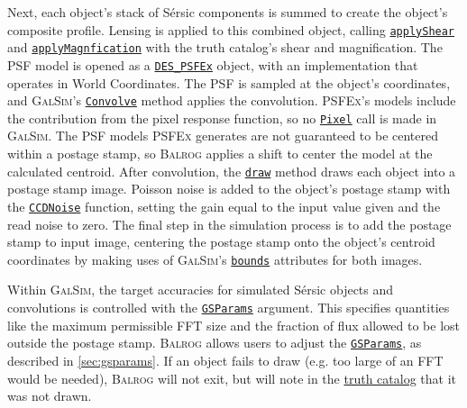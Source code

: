 \documentclass[11pt]{book}
\newcommand{\galsim}{\textsc{GalSim}}
\newcommand{\balrog}{\textsc{Balrog}}
\newcommand{\psfex}{\textsc{PSFEx}}
\newcommand{\sersic}{S\'{e}rsic}
\begin{document}
Next, each object's stack of \sersic{} components is summed to create the object's composite profile. 
Lensing is applied to this combined object, 
calling \href{http://galsim-developers.github.io/GalSim/classgalsim\_1\_1base\_1\_1\_g\_s\_object.html#a85cc0094dcf470cfbff93d9830ab80bd}{\texttt{applyShear}}
and \href{http://galsim-developers.github.io/GalSim/classgalsim\_1\_1base\_1\_1\_g\_s\_object.html#a9d13b0238057f6d5d01f2681d91c09b0}{\texttt{applyMagnfication}}
with the truth catalog's shear and magnification.
The PSF model is opened as a 
\href{http://galsim-developers.github.io/GalSim/classgalsim\_1\_1des\_1\_1des\_\_psfex\_1\_1\_d\_e\_s\_\_\_p\_s\_f\_ex.html}{\texttt{DES\_PSFEx}} object, 
with an implementation that operates in World Coordinates. 
The PSF is sampled at the object's coordinates, 
and \galsim{}'s \href{http://galsim-developers.github.io/GalSim/classgalsim\_1\_1compound\_1\_1\_convolution.html}{\texttt{Convolve}} method applies the convolution.
\psfex{}'s models include the contribution from the pixel response function, 
so no \href{http://galsim-developers.github.io/GalSim/classgalsim\_1\_1base\_1\_1\_pixel.html}{\texttt{Pixel}} call is made in \galsim{}.
The PSF models \psfex{} generates are not guaranteed to be centered within a postage stamp, 
so \balrog{} applies a shift to center the model at the calculated centroid.
After convolution, 
the \href{http://galsim-developers.github.io/GalSim/classgalsim\_1\_1base\_1\_1\_g\_s\_object.html#ae0b346a8b438dedbc7f60a52220869d8}{\texttt{draw}} 
method draws each object into a postage stamp image.
Poisson noise is added to the object's postage stamp with the 
\href{http://galsim-developers.github.io/GalSim/classgalsim\_1\_1\_c\_c\_d\_noise.html}{\texttt{CCDNoise}} function, 
setting the gain equal to the input value given and the read noise to zero.
The final step in the simulation process is to add the postage stamp to input image, 
centering the postage stamp onto the object's centroid coordinates 
by making uses of \galsim{}'s \href{http://galsim-developers.github.io/GalSim/classgalsim\_1\_1\_bounds.html}{\texttt{bounds}} attributes for both images.

Within \galsim{}, the target accuracies for simulated \sersic{} objects and convolutions is controlled with the 
\href{http://galsim-developers.github.io/GalSim/structgalsim\_1\_1\_g\_s\_params.html}{\texttt{GSParams}} argument.
This specifies quantities like the maximum permissible FFT size and the fraction of flux allowed to be lost outside the postage stamp.
\balrog{} allows users to adjust the \href{http://galsim-developers.github.io/GalSim/structgalsim\_1\_1\_g\_s\_params.html}{\texttt{GSParams}}, 
as described in \autoref{sec:gsparams}.
If an object fails to draw (e.g. too large of an FFT would be needed),
\balrog{} will not exit, but will note in the \hyperref[sec:catalogs]{truth catalog} that it was not drawn.
\end{document}
